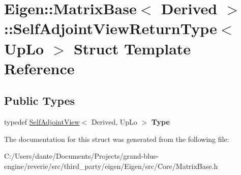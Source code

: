 \hypertarget{struct_eigen_1_1_matrix_base_1_1_self_adjoint_view_return_type}{}\section{Eigen\+::Matrix\+Base$<$ Derived $>$\+::Self\+Adjoint\+View\+Return\+Type$<$ Up\+Lo $>$ Struct Template Reference}
\label{struct_eigen_1_1_matrix_base_1_1_self_adjoint_view_return_type}
\subsection*{Public Types}
\begin{DoxyCompactItemize}
\item 
\mbox{\label{struct_eigen_1_1_matrix_base_1_1_self_adjoint_view_return_type_a5773a46c08e277d36bc4c4d790436c2b}} 
typedef \mbox{\hyperlink{class_eigen_1_1_self_adjoint_view}{Self\+Adjoint\+View}}$<$ Derived, Up\+Lo $>$ {\bfseries Type}
\end{DoxyCompactItemize}


The documentation for this struct was generated from the following file\+:\begin{DoxyCompactItemize}
\item 
C\+:/\+Users/dante/\+Documents/\+Projects/grand-\/blue-\/engine/reverie/src/third\+\_\+party/eigen/\+Eigen/src/\+Core/Matrix\+Base.\+h\end{DoxyCompactItemize}

